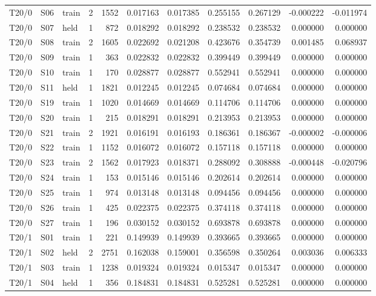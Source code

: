 {\begin{longtable}{@{}lllrrrrrrrr@{}}
T20/0 & S06 & train & 2 & 1552 & 0.017163 & 0.017385 & 0.255155 & 0.267129 & -0.000222 & -0.011974 \\
T20/0 & S07 & held & 1 & 872 & 0.018292 & 0.018292 & 0.238532 & 0.238532 & 0.000000 & 0.000000 \\
T20/0 & S08 & train & 2 & 1605 & 0.022692 & 0.021208 & 0.423676 & 0.354739 & 0.001485 & 0.068937 \\
T20/0 & S09 & train & 1 & 363 & 0.022832 & 0.022832 & 0.399449 & 0.399449 & 0.000000 & 0.000000 \\
T20/0 & S10 & train & 1 & 170 & 0.028877 & 0.028877 & 0.552941 & 0.552941 & 0.000000 & 0.000000 \\
T20/0 & S11 & held & 1 & 1821 & 0.012245 & 0.012245 & 0.074684 & 0.074684 & 0.000000 & 0.000000 \\
T20/0 & S19 & train & 1 & 1020 & 0.014669 & 0.014669 & 0.114706 & 0.114706 & 0.000000 & 0.000000 \\
T20/0 & S20 & train & 1 & 215 & 0.018291 & 0.018291 & 0.213953 & 0.213953 & 0.000000 & 0.000000 \\
T20/0 & S21 & train & 2 & 1921 & 0.016191 & 0.016193 & 0.186361 & 0.186367 & -0.000002 & -0.000006 \\
T20/0 & S22 & train & 1 & 1152 & 0.016072 & 0.016072 & 0.157118 & 0.157118 & 0.000000 & 0.000000 \\
T20/0 & S23 & train & 2 & 1562 & 0.017923 & 0.018371 & 0.288092 & 0.308888 & -0.000448 & -0.020796 \\
T20/0 & S24 & train & 1 & 153 & 0.015146 & 0.015146 & 0.202614 & 0.202614 & 0.000000 & 0.000000 \\
T20/0 & S25 & train & 1 & 974 & 0.013148 & 0.013148 & 0.094456 & 0.094456 & 0.000000 & 0.000000 \\
T20/0 & S26 & train & 1 & 425 & 0.022375 & 0.022375 & 0.374118 & 0.374118 & 0.000000 & 0.000000 \\
T20/0 & S27 & train & 1 & 196 & 0.030152 & 0.030152 & 0.693878 & 0.693878 & 0.000000 & 0.000000 \\
T20/1 & S01 & train & 1 & 221 & 0.149939 & 0.149939 & 0.393665 & 0.393665 & 0.000000 & 0.000000 \\
T20/1 & S02 & held & 2 & 2751 & 0.162038 & 0.159001 & 0.356598 & 0.350264 & 0.003036 & 0.006333 \\
T20/1 & S03 & train & 1 & 1238 & 0.019324 & 0.019324 & 0.015347 & 0.015347 & 0.000000 & 0.000000 \\
T20/1 & S04 & held & 1 & 356 & 0.184831 & 0.184831 & 0.525281 & 0.525281 & 0.000000 & 0.000000 \\

\end{longtable}}
